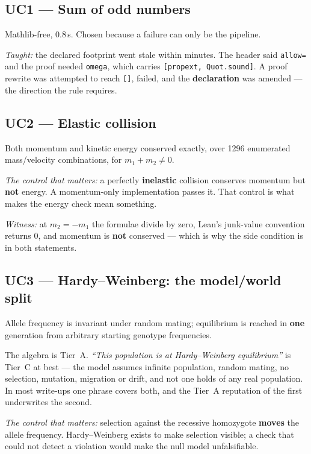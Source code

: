 \documentclass[11pt,a4paper]{article}
\begin{document}
\subsection{UC1 — Sum of odd numbers}

Mathlib-free, 0.8\,s. Chosen because a failure can only be the pipeline.

\emph{Taught:} the declared footprint went stale within minutes. The header said
\texttt{allow=} and the proof needed \texttt{omega}, which carries
\texttt{[propext, Quot.sound]}. A proof rewrite was attempted to reach \texttt{[]}, failed, and
the \textbf{declaration} was amended — the direction the rule requires.

\subsection{UC2 — Elastic collision}

Both momentum and kinetic energy conserved exactly, over 1296 enumerated mass/velocity
combinations, for $m_1 + m_2 \neq 0$.

\emph{The control that matters:} a perfectly \textbf{inelastic} collision conserves momentum but
\textbf{not} energy. A momentum-only implementation passes it. That control is what makes the
energy check mean something.

\emph{Witness:} at $m_2 = -m_1$ the formulae divide by zero, Lean's junk-value convention returns
$0$, and momentum is \textbf{not} conserved — which is why the side condition is in both
statements.

\subsection{UC3 — Hardy–Weinberg: the model/world split}

Allele frequency is invariant under random mating; equilibrium is reached in \textbf{one}
generation from arbitrary starting genotype frequencies.

The algebra is Tier~A. \emph{``This population is at Hardy–Weinberg equilibrium''} is Tier~C at
best — the model assumes infinite population, random mating, no selection, mutation, migration or
drift, and not one holds of any real population. In most write-ups one phrase covers both, and
the Tier~A reputation of the first underwrites the second.

\emph{The control that matters:} selection against the recessive homozygote \textbf{moves} the
allele frequency. Hardy–Weinberg exists to make selection visible; a check that could not detect
a violation would make the null model unfalsifiable.
\end{document}
